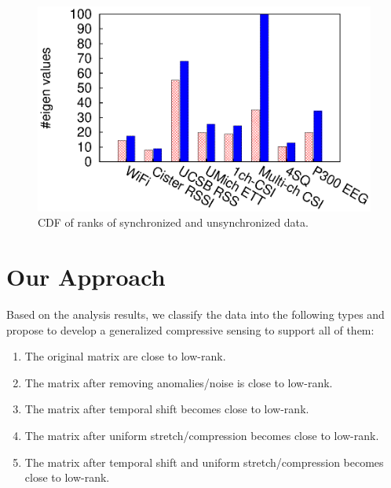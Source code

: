 \begin{figure}[h!]
  \centering
  \includegraphics[width=1\figurewidthA]{fig_gen/rank.shift.eps}
  \caption{CDF of ranks of synchronized and unsynchronized data.}
  \label{fig:sync-matrix-rank}
\end{figure}


\section{Our Approach}

Based on the analysis results, we classify the data into the following types and propose to develop a generalized compressive sensing to support all of them:
\begin{enumerate}
\item The original matrix are close to low-rank.

\item The matrix after removing anomalies/noise is close to low-rank.

\item The matrix after temporal shift becomes close to low-rank.

\item The matrix after uniform stretch/compression becomes close to low-rank.

\item The matrix after temporal shift and uniform stretch/compression becomes close to low-rank.
\end{enumerate}

